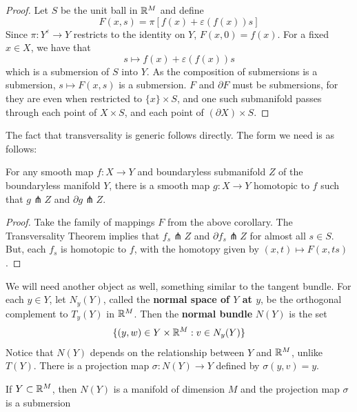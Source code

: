 \begin{proof}
    Let $S$ be the unit ball in $\mathbb{R}^M$ and define 
    \[F(x,s) = \pi[f(x) + \varepsilon(f(x))s]\]
    Since $\pi: Y^\varepsilon \to Y$ restricts to the identity on $Y$, $F(x,0) = f(x)$. For a fixed $x \in X$, we have that 
    \[s \mapsto f(x) + \varepsilon(f(x))s\]
    which is a submersion of $S$ into $Y$. As the composition of submersions is a submersion, $s \mapsto F(x,s)$ is a submersion. $F$ and $\partial F$ must be submersions, for they are even when restricted to $\{x\} \times S$, and one such submanifold passes through each point of $X \times S$, and each point of $(\partial X) \times S$. 
\end{proof}

The fact that transversality is generic follows directly. The form we need is as follows:

\begin{theorem}
    For any smooth map $f: X \to Y$ and boundaryless submanifold $Z$ of the boundaryless manifold $Y$, there is a smooth map $g: X \to Y$ homotopic to $f$ such that $g \pitchfork Z$ and $\partial g \pitchfork Z$. 
\end{theorem}

\begin{proof}
    Take the family of mappings $F$ from the above corollary. The Transversality Theorem implies that $f_s \pitchfork Z$ and $\partial f_s \pitchfork Z$ for almost all $s \in S$. But, each $f_s$ is homotopic to $f$, with the homotopy given by $(x,t) \mapsto F(x,ts)$. 
\end{proof}

We will need another object as well, something similar to the tangent bundle. For each $y \in Y$, let $N_y(Y)$, called the \textbf{normal space of $Y$ at $y$}, be the orthogonal complement to $T_y(Y)$ in $\mathbb{R}^M$. Then the \textbf{normal bundle} $N(Y)$ is the set
\[\{(y,w) \in Y \times \mathbb{R}^M : v \in N_y(Y)\}\]
Notice that $N(Y)$ depends on the relationship between $Y$ and $\mathbb{R}^M$, unlike $T(Y)$. There is a projection map $\sigma: N(Y) \to Y$ defined by $\sigma(y,v) = y$. 

\begin{prop}
    If $Y \subset \mathbb{R}^M$, then $N(Y)$ is a manifold of dimension $M$ and the projection map $\sigma$ is a submersion
\end{prop}

